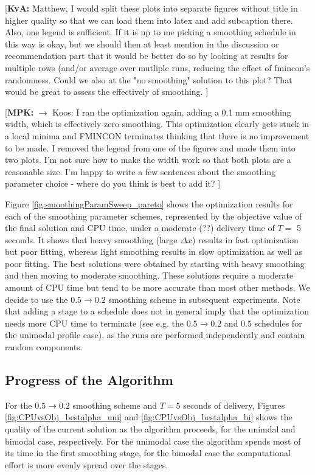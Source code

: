 \documentclass{iopart}
\newcommand{\MPKcomment}[1]{{\color{magenta}\par {[{\bf MPK: } { #1}} ] \\    }}
\newcommand{\KvAcomment}[1]{{\color{magenta}\par {[{\bf KvA: } { #1}} ] \\    }}
\begin{document}
\KvAcomment{Matthew, I would split these plots into separate figures without title in higher quality so that we can load them into latex and add subcaption there. Also, one legend is sufficient. If it is up to me picking a smoothing schedule in this way is okay, but we should then at least mention in the discussion or recommendation part that it would be better do so by looking at results for multiple rows (and/or average over mutliple runs, reducing the effect of fmincon's randomness.
Could we also at the "no smoothing" solution to this plot? That would be great to assess the effectively of smoothing.}
\MPKcomment{ $\to$ Koos:  I ran the optimization again, adding a 0.1 mm smoothing width, which is effectively zero smoothing. This optimization clearly gets stuck in a local minima and FMINCON terminates thinking that there is no improvement to be made. I removed the legend from one of the figures and made them into two plots. I'm not sure how to make the width work so that both plots are a reasonable size. I'm happy to write a few sentences about the smoothing parameter choice - where do you think is best to add it?}

Figure \ref{fig:smoothingParamSweep_pareto} shows the optimization results for each of the smoothing parameter schemes,  represented by the objective value of the final solution and CPU time, under a moderate (??) delivery time of $T=$ 5 seconds. 
It shows that heavy smoothing (large $\Delta x$) results in fast optimization but poor fitting, whereas light smoothing results in slow optimization as well as poor fitting.
The best solutions were obtained by starting with heavy smoothing and then moving to moderate smoothing.
These solutions require a moderate amount of CPU time but tend to be more accurate than most other methods.
We decide to use the $ 0.5 \rightarrow 0.2 $ smoothing scheme in subsequent experiments.
Note that adding a stage to a schedule does not in general imply that the optimization needs more CPU time to terminate (see e.g. the $0.5 \rightarrow 0.2$ and $0.5$ schedules for the unimodal profile case), as the runs are performed independently and contain random components.

\subsection{Progress of the Algorithm}
For the $0.5 \rightarrow 0.2$ smoothing scheme and $T=5$ seconds of delivery,
    Figures \ref{fig:CPUvsObj_bestalpha_uni} and \ref{fig:CPUvsObj_bestalpha_bi} shows the quality of the current solution as the algorithm proceeds,
    for the unimdal and bimodal case, respectively.
For the unimodal case the algorithm spends most of its time in the first smoothing stage, for the bimodal case the computational effort is more evenly spread over the stages.
\end{document}
